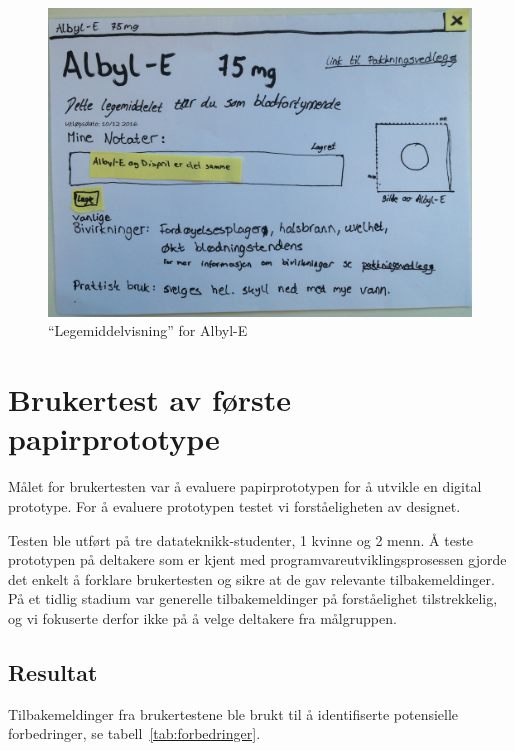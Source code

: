 \begin{figure}[H]
    \centering
    \includegraphics[width=1\textwidth]{fig/utviklingAvPrototype/Albyl-e.jpg}
    \caption{“Legemiddelvisning” for Albyl-E}
    \label{fig:albyl-e}
\end{figure} 

\section{Brukertest av første papirprototype} \label{sec:firstBrukertest}
Målet for brukertesten var å evaluere papirprototypen for å utvikle en digital prototype. For å evaluere prototypen testet vi forståeligheten av designet.

Testen ble utført på tre datateknikk-studenter, 1 kvinne og 2 menn. Å teste prototypen på deltakere som er kjent med programvareutviklingsprosessen gjorde det enkelt å forklare brukertesten og sikre at de gav relevante tilbakemeldinger. På et tidlig stadium var generelle tilbakemeldinger på forståelighet tilstrekkelig, og vi fokuserte derfor ikke på å velge deltakere fra målgruppen.

\subsection{Resultat}
Tilbakemeldinger fra brukertestene ble brukt til å identifiserte potensielle forbedringer, se tabell~\ref{tab:forbedringer}.

